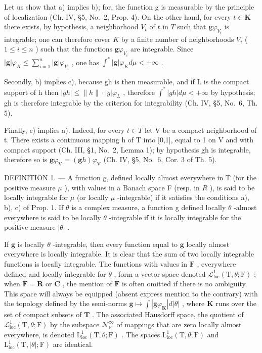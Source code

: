 Let us show that a) implies b); for, the function g is measurable by the principle of localization (Ch. IV, §5, No.~2, Prop. 4). On the other hand, for every \(t \in \mathbf{K}\) there exists, by hypothesis, a neighborhood \(V_t\) of \(t\) in \(T\) such that \(\mathbf{g}\varphi_{V_t}\) is integrable; one can therefore cover \(K\) by a finite number of neighborhoods \(V_i\) ( \(1 \leqslant i \leqslant n\) ) such that the functions \(\mathbf{g}\varphi_{V_i}\) are integrable. Since \(|\mathbf{g}| \varphi_K \leqslant \sum_{i=1}^{n} |\mathbf{g}| \varphi_{V_i}\) , one has \(\int^* |\mathbf{g}| \varphi_K d\mu < +\infty\) .

Secondly, b) implies c), because gh is then measurable, and if L is the compact support of h then \(|gh| \leqslant \|h\|\cdot|g|\varphi_{L}\) , therefore \(\int^{*}|gh|d\mu < +\infty\) by hypothesis; gh is therefore integrable by the criterion for integrability (Ch. IV, §5, No.~6, Th. 5).

Finally, c) implies a). Indeed, for every \(t \in T\) let V be a compact neighborhood of t. There exists a continuous mapping h of T into {[}0,1{]}, equal to 1 on V and with compact support (Ch. III, §1, No.~2, Lemma 1); by hypothesis gh is integrable, therefore so is \(\mathbf{g}\varphi_{\mathrm{V}} = (\mathbf{g}h)\varphi_{\mathrm{V}}\) (Ch. IV, §5, No.~6, Cor. 3 of Th. 5).

DEFINITION 1. --- A function g, defined locally almost everywhere in T (for the positive measure \(\mu\) ), with values in a Banach space F (resp. in \(\overline{R}\) ), is said to be locally integrable for \(\mu\) (or locally \(\mu\) -integrable) if it satisfies the conditions a), b), c) of Prop. 1. If \(\theta\) is a complex measure, a function g defined locally \(\theta\) -almost everywhere is said to be locally \(\theta\) -integrable if it is locally integrable for the positive measure \(|\theta|\) .

If \(\mathbf{g}\) is locally \(\theta\) -integrable, then every function equal to \(\mathbf{g}\) locally almost everywhere is locally integrable. It is clear that the sum of two locally integrable functions is locally integrable. The functions with values in \(\mathbf{F}\) , everywhere defined and locally integrable for \(\theta\) , form a vector space denoted \(\mathcal{L}_{\mathrm{loc}}^{1}(\mathrm{T},\theta ;\mathrm{F})\) ; when \(\mathbf{F} = \mathbf{R}\) or \(\mathbf{C}\) , the mention of \(\mathbf{F}\) is often omitted if there is no ambiguity. This space will always be equipped (absent express mention to the contrary) with the topology defined by the semi-norms \(\mathbf{g}\mapsto \int |\mathbf{g}\varphi_{\mathbf{K}}|d|\theta |\) , where \(\mathbf{K}\) runs over the set of compact subsets of \(\mathbf{T}\) . The associated Hausdorff space, the quotient of \(\mathcal{L}_{\mathrm{loc}}^{1}(\mathrm{T},\theta ;\mathrm{F})\) by the subspace \(\mathcal{N}_{\mathrm{F}}^{\infty}\) of mappings that are zero locally almost everywhere, is denoted \(\mathrm{L}_{\mathrm{loc}}^{1}(\mathrm{T},\theta ;\mathrm{F})\) . The spaces \(\mathrm{L}_{\mathrm{loc}}^{1}(\mathrm{T},\theta ;\mathrm{F})\) and \(\mathrm{L}_{\mathrm{loc}}^{1}(\mathrm{T},|\theta |; \mathrm{F})\) are identical.

